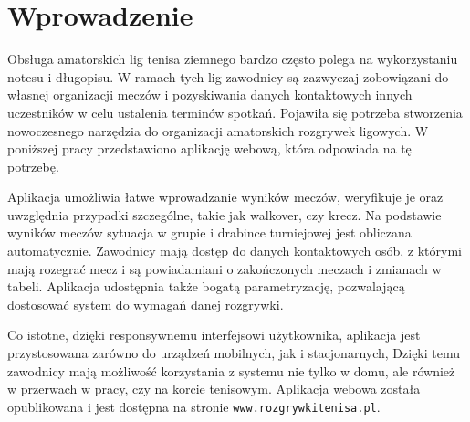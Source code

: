 \documentclass[shortabstract]{iithesis}
\author         {Marcin Wróbel}
\begin{document}

\chapter{Wprowadzenie}
Obsługa amatorskich lig tenisa ziemnego bardzo często polega na wykorzystaniu notesu i długopisu.
W ramach tych lig zawodnicy są zazwyczaj zobowiązani do własnej organizacji meczów i pozyskiwania danych kontaktowych innych uczestników w celu ustalenia terminów spotkań.
Pojawiła się potrzeba stworzenia nowoczesnego narzędzia do organizacji amatorskich rozgrywek ligowych.
W poniższej pracy przedstawiono aplikację webową, która odpowiada na tę potrzebę.
\par
Aplikacja umożliwia łatwe wprowadzanie wyników meczów, weryfikuje je oraz uwzględnia przypadki szczególne, takie jak walkover, czy krecz.
Na podstawie wyników meczów sytuacja w grupie i drabince turniejowej jest obliczana automatycznie.
Zawodnicy mają dostęp do danych kontaktowych osób, z którymi mają rozegrać mecz i są powiadamiani o zakończonych meczach i zmianach w tabeli.
Aplikacja udostępnia także bogatą parametryzację, pozwalającą dostosować system do wymagań danej rozgrywki.

\par
Co istotne, dzięki responsywnemu interfejsowi użytkownika, aplikacja jest przystosowana zarówno do urządzeń mobilnych, jak i stacjonarnych,
Dzięki temu zawodnicy mają możliwość korzystania z systemu nie tylko w domu, ale również w przerwach w pracy, czy na korcie tenisowym.
Aplikacja webowa została opublikowana i jest dostępna na stronie \texttt{www.rozgrywkitenisa.pl}.
\par
\end{document}
